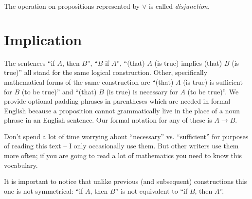\documentclass[12pt]{book}
\begin{document}
The operation on propositions represented by $\vee$ is called {\em
disjunction\/}.

\section{Implication}

The sentences ``if $A$, then $B$'', ``$B$ if $A$'', ``(that) $A$ (is
true) implies (that) $B$ (is true)'' all stand for the same logical
construction.  Other, specifically mathematical forms of the same
construction are ``(that) $A$ (is true) is sufficient for $B$ (to be
true)'' and ``(that) $B$ (is true) is necessary for $A$ (to be
true)''.  We provide optional padding phrases in parentheses which are
needed in formal English because a proposition cannot grammatically
live in the place of a noun phrase in an English sentence.  Our formal
notation for any of these is $A \rightarrow B$.

Don't spend a lot of time worrying about ``necessary''
vs. ``sufficient'' for purposes of reading this text -- I only
occasionally use them.  But other writers use them more often; if you
are going to read a lot of mathematics you need to know this
vocabulary.

It is important to notice that unlike previous (and subsequent) constructions this one
is not symmetrical: ``if $A$, then $B$'' is not equivalent to ``if $B$,
then $A$''.
\end{document}
